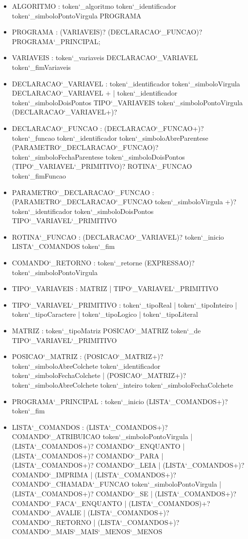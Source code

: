 \documentclass[
12pt,				%
a4paper,			%
english,			%
french,				%
spanish,			%
brazil,				%
article
]{abntex2}
\begin{document}
\begin{itemize}
	\item ALGORITMO : token\char`_algoritmo token\char`_identificador token\char`_simboloPontoVirgula PROGRAMA
	\item PROGRAMA : (VARIAVEIS)? (DECLARACAO\char`_FUNCAO)? PROGRAMA\char`_PRINCIPAL; 
	\item VARIAVEIS : token\char`_variaveis DECLARACAO\char`_VARIAVEL token\char`_fimVariaveis
	\item DECLARACAO\char`_VARIAVEL : token\char`_identificador token\char`_simboloVirgula DECLARACAO\char`_VARIAVEL $+$ | token\char`_identificador token\char`_simboloDoisPontos TIPO\char`_VARIAVEIS token\char`_simboloPontoVirgula (DECLARACAO\char`_VARIAVEL+)?
	\item DECLARACAO\char`_FUNCAO : (DECLARACAO\char`_FUNCAO+)? token\char`_funcao token\char`_identificador token\char`_simboloAbreParentese (PARAMETRO\char`_DECLARACAO\char`_FUNCAO)? token\char`_simboloFechaParentese token\char`_simboloDoisPontos (TIPO\char`_VARIAVEL\char`_PRIMITIVO)? ROTINA\char`_FUNCAO token\char`_fimFuncao
	\item PARAMETRO\char`_DECLARACAO\char`_FUNCAO : (PARAMETRO\char`_DECLARACAO\char`_FUNCAO token\char`_simboloVirgula +)?  token\char`_identificador token\char`_simboloDoisPontos TIPO\char`_VARIAVEL\char`_PRIMITIVO
	\item ROTINA\char`_FUNCAO : (DECLARACAO\char`_VARIAVEL)? token\char`_inicio LISTA\char`_COMANDOS token\char`_fim
	\item COMANDO\char`_RETORNO : token\char`_retorne (EXPRESSAO)? token\char`_simboloPontoVirgula
	\item TIPO\char`_VARIAVEIS : MATRIZ | TIPO\char`_VARIAVEL\char`_PRIMITIVO
	\item TIPO\char`_VARIAVEL\char`_PRIMITIVO : token\char`_tipoReal | token\char`_tipoInteiro | token\char`_tipoCaractere | token\char`_tipoLogico | token\char`_tipoLiteral
	\item MATRIZ : token\char`_tipoMatriz POSICAO\char`_MATRIZ token\char`_de TIPO\char`_VARIAVEL\char`_PRIMITIVO
	\item POSICAO\char`_MATRIZ : (POSICAO\char`_MATRIZ+)? token\char`_simboloAbreColchete token\char`_identificador token\char`_simboloFechaColchete | (POSICAO\char`_MATRIZ+)? token\char`_simboloAbreColchete token\char`_inteiro token\char`_simboloFechaColchete
	\item PROGRAMA\char`_PRINCIPAL : token\char`_inicio (LISTA\char`_COMANDOS+)? token\char`_fim
	\item LISTA\char`_COMANDOS : (LISTA\char`_COMANDOS+)? COMANDO\char`_ATRIBUICAO token\char`_simboloPontoVirgula | (LISTA\char`_COMANDOS+)? COMANDO\char`_ENQUANTO | (LISTA\char`_COMANDOS+)? COMANDO\char`_PARA | (LISTA\char`_COMANDOS+)? COMANDO\char`_LEIA | (LISTA\char`_COMANDOS+)? COMANDO\char`_IMPRIMA | (LISTA\char`_COMANDOS+)? COMANDO\char`_CHAMADA\char`_FUNCAO token\char`_simboloPontoVirgula | (LISTA\char`_COMANDOS+)? COMANDO\char`_SE | (LISTA\char`_COMANDOS+)? COMANDO\char`_FACA\char`_ENQUANTO | (LISTA\char`_COMANDOS)+? COMANDO\char`_AVALIE | (LISTA\char`_COMANDOS+)? COMANDO\char`_RETORNO | (LISTA\char`_COMANDOS+)? COMANDO\char`_MAIS\char`_MAIS\char`_MENOS\char`_MENOS

\end{itemize}
\end{document}
